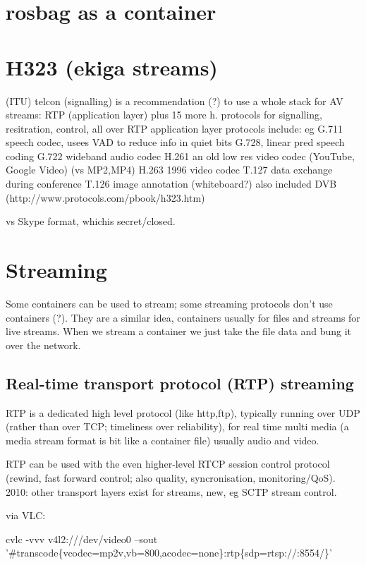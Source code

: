 \documentclass[oneside,english]{scrbook}
\begin{document}
\chapter{rosbag as a container}

\chapter{H323 (ekiga streams)}
 (ITU) telcon  (signalling)
	is a recommendation (?) to use a whole stack for AV streams:
		RTP (application layer)		
		plus 15 more h. protocols for signalling, resitration, control, all over RTP
		application layer protocols include:
			eg G.711 speech codec, usees VAD to reduce info in quiet bits
			    G.728, linear pred speech coding
			G.722 wideband audio codec
			H.261 an old low res video codec (YouTube, Google Video) (vs MP2,MP4)
			H.263 1996 video codec
			T.127 data exchange during conference
			T.126 image annotation (whiteboard?)
		also included DVB
		(http://www.protocols.com/pbook/h323.htm)

vs Skype format, whichis secret/closed.


\chapter{Streaming}
Some containers can be used to stream; some streaming protocols don't use containers (?). They are a similar idea, containers usually for files and streams for live streams. When we stream a container we just take the file data and bung it over the network.

\section{Real-time transport protocol (RTP) streaming}

RTP is a dedicated high level protocol (like http,ftp), typically running over UDP (rather than over TCP; timeliness over reliability), for real time multi media (a media stream format is bit like a container file) usually audio and video.

RTP can be used with the even higher-level RTCP session control protocol (rewind, fast forward control; also quality, syncronisation, monitoring/QoS).   2010: other transport layers exist for streams, new, eg SCTP stream control.

via VLC: 

cvlc -vvv v4l2:///dev/video0 --sout '\#transcode\{vcodec=mp2v,vb=800,acodec=none\}:rtp\{sdp=rtsp://:8554/\}' 
\end{document}
